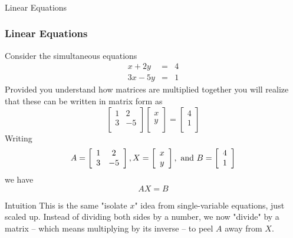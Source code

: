   \begin{frame}[fragile]\frametitle{}
\begin{center}
{\Large Linear Equations }
\end{center}
\end{frame}


  \begin{frame}[fragile]\frametitle{Linear Equations}

Consider the simultaneous equations
\begin{eqnarray*}
x + 2y &=& 4\\
3x-5y &=& 1 
\end{eqnarray*}
Provided you understand how matrices are multiplied together you will realize
that these can be written in matrix form as
$$
\left[
\begin{array}{cc}
1 & 2 \\
3 & -5 \\
\end{array}
\right]\left[
\begin{array}{c}
x \\
y\\
\end{array}\right] =\left[
\begin{array}{c}
4 \\
1\\
\end{array} 
\right]
$$
Writing
$$
A = \left[
\begin{array}{cc}
1 & 2 \\
3 & -5 \\
\end{array}
\right], X = \left[
\begin{array}{c}
x \\
y\\
\end{array}\right], \hbox { and } B=\left[
\begin{array}{c}
4 \\
1\\
\end{array} 
\right]
$$
we have
$$
AX=B
$$

\begin{block}{Intuition}
This is the same "isolate $x$" idea from single-variable equations, just scaled up. Instead of dividing both sides by a number, we now "divide" by a matrix -- which means multiplying by its inverse -- to peel $A$ away from $X$.
\end{block}
\end{frame}


